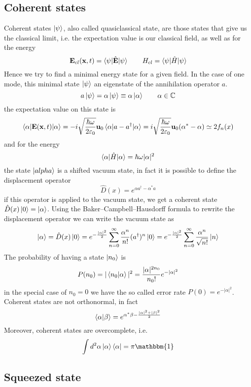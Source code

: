\documentclass[12pt]{article}
\theoremstyle{plain}
\newcommand{\C}{\mathbb{C}}
\newcommand{\x}{\mathbf{x}}
\theoremstyle{definition}
\theoremstyle{remark}
\begin{document}
\subsection{Coherent states}
Coherent states $\ket{\psi}$, also called quasiclassical state, are those states that give us the classical limit, i.e. the expectation value is our classical field, as well as for the energy
\[\mathbf{E}_{cl}(\x,t) = \braket{\psi|\hat{\mathbf{E}}|\psi} \qquad H_{cl} = \braket{\psi|\hat{H}|\psi} \]
Hence we try to find a minimal energy state for a given field. In the case of one mode, this minimal state $\ket{\psi}$  an eigenstate of the annihilation operator $a$.
\[a\ket{\psi} = \alpha \ket{\psi}\equiv \alpha\ket{\alpha} \qquad \alpha\in\C\] 
the expectation value on this state is
\[\braket{\alpha|\mathbf{E}(\x,t)|\alpha} = -i \sqrt{\frac{\hbar \omega}{2\varepsilon_0}} \mathbf{u}_0\braket{\alpha|a-a^\dagger |\alpha} = i \sqrt{\frac{\hbar \omega}{2\varepsilon_0}} \mathbf{u}_0 (\alpha^* - \alpha) \simeq 2f_n(x)\]
and for the energy
\[\braket{\alpha|\hat{H}|\alpha} = \hbar \omega |\alpha|^2\]
the state $\ket{alpha}$ is a shifted vacuum state, in fact it is possible to define the displacement operator
\[\hat{D}(x) = e^{\alpha a^\dagger - \alpha^* a}\]
if this operator is applied to the vacuum state, we get a coherent state $\hat{D}(x) \ket{0} = \ket{\alpha}$. Using the Baker–Campbell–Hausdorff formula to rewrite the displacement operator we can write the vacuum state as
\[\ket{\alpha} = \hat{D}(x) \ket{0} = e^{-\frac{|\alpha|^2}{2}}\sum_{n=0}^\infty \frac{\alpha^n}{n!}(a^\dagger)^n \ket{0} = e^{-\frac{|\alpha|^2}{2}}\sum_{n=0}^\infty \frac{\alpha^n}{\sqrt{n!}}\ket{n}\]
The probability of having a state $\ket{n_0}$ is
\[P(n_0) = |\braket{n_0|\alpha}|^2 = \frac{|\alpha|^{2n_0}}{n_0!} e^{-|\alpha|^2}\]
in the special case of $n_0=0$ we have the so called error rate $P(0) = e^{-|\alpha|^2}$. Coherent states are not orthonormal, in fact
\[\braket{\alpha|\beta} =e^{\alpha^*\beta -\frac{|\alpha|^2+|\beta|^2}{2}} \]
Moreover, coherent states are overcomplete, i.e. 
\[\int d^2\alpha \ket{\alpha}\bra{\alpha} = \pi \mathbbm{1}\]
\subsection{Squeezed state}
\end{document}

